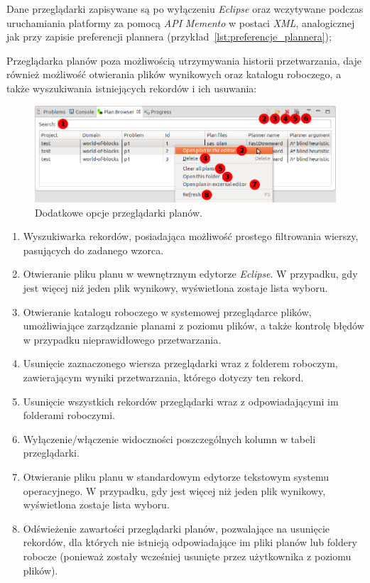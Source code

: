 Dane przeglądarki zapisywane są po wyłączeniu \textit{Eclipse} oraz wczytywane podczas uruchamiania platformy za pomocą \textit{API} \textit{Memento} w postaci \textit{XML}, analogicznej jak przy zapisie preferencji plannera (przykład~\ref{lst:preferencje_plannera});

Przeglądarka planów poza możliwością utrzymywania historii przetwarzania, daje również możliwość otwierania plików wynikowych oraz katalogu roboczego, a także wyszukiwania istniejących rekordów i ich usuwania:

\begin{figure}[h!]
    \centering
    \includegraphics[width=\textwidth]{img/plan_browser_options}
    \caption{Dodatkowe opcje przeglądarki planów.}
    \label{fig:plan_browser_options}
\end{figure}

\begin{enumerate}
\item Wyszukiwarka rekordów, posiadająca możliwość prostego filtrowania wierszy, pasujących do zadanego wzorca.
\item Otwieranie pliku planu w wewnętrznym edytorze \textit{Eclipse}. W przypadku, gdy jest więcej niż jeden plik wynikowy, wyświetlona zostaje lista wyboru.
\item Otwieranie katalogu roboczego w systemowej przeglądarce plików, umożliwiające zarządzanie planami z poziomu plików, a także kontrolę błędów w przypadku nieprawidłowego przetwarzania.
\item Usunięcie zaznaczonego wiersza przeglądarki wraz z folderem roboczym, zawierającym wyniki przetwarzania, którego dotyczy ten rekord.
\item Usunięcie wszystkich rekordów przeglądarki wraz z odpowiadającymi im folderami roboczymi.
\item Wyłączenie/włączenie widoczności poszczególnych kolumn w tabeli przeglądarki.
\item Otwieranie pliku planu w standardowym edytorze tekstowym systemu operacyjnego. W przypadku, gdy jest więcej niż jeden plik wynikowy, wyświetlona zostaje lista wyboru.
\item Odświeżenie zawartości przeglądarki planów, pozwalające na usunięcie rekordów, dla których nie istnieją odpowiadające im pliki planów lub foldery robocze (ponieważ zostały wcześniej usunięte przez użytkownika z poziomu plików).
\end{enumerate}

